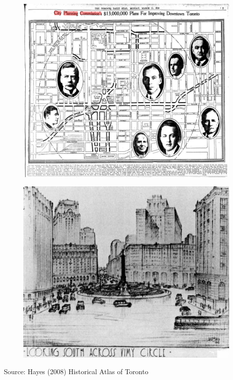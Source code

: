 \documentclass[aspectratio=169]{beamer}
\begin{document}
\begin{frame}
	
	\begin{figure}
		\centering
		\includegraphics[width=0.7\linewidth]{images/toronto_road_plans_1929.jpg}
		
	\end{figure}
	
	
\end{frame}



\begin{frame}
	
	\begin{figure}
		\centering
		\includegraphics[width=0.7\linewidth]{images/vimy_circle.jpg}
		
		
		
	\end{figure}

\tiny{Source: Hayes (2008) Historical Atlas of Toronto}
	
	
\end{frame}
\end{document}

